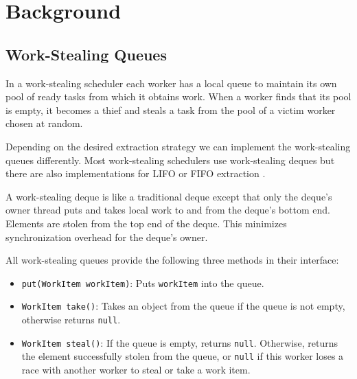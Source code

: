 
\chapter{Background}
\label{chap:queues-background}

\section{Work-Stealing Queues}
\label{sec:queues-background-work-stealing-queues}

In a work-stealing scheduler each worker has a local queue to maintain
its own pool of ready tasks from which it obtains work. When a worker
finds that its pool is empty, it becomes a thief and steals a task
from the pool of a victim worker chosen at random.

Depending on the desired extraction strategy we can implement the
work-stealing queues differently. Most work-stealing schedulers use
work-stealing deques \cite{Arora2001, Acar2002, Blumofe1995,
  Frigo1998, Danaher2005} but there are also implementations for LIFO
or FIFO extraction \cite{Michael2009}.

A work-stealing deque is like a traditional deque \cite{Knuth1997}
except that only the deque's owner thread puts and takes local work to
and from the deque's bottom end. Elements are stolen from the top end
of the deque. This minimizes synchronization overhead for the deque's
owner.

All work-stealing queues provide the following three methods in their
interface:

\begin{itemize}
\item \lstinline!put(WorkItem workItem)!: Puts \lstinline!workItem!
  into the queue.
\item \lstinline!WorkItem take()!: Takes an object from the queue if
  the queue is not empty, otherwise returns \lstinline!null!.
\item \lstinline!WorkItem steal()!: If the queue is empty, returns
  \lstinline!null!. Otherwise, returns the element successfully stolen
  from the queue, or \lstinline!null! if this worker loses a race with
  another worker to steal or take a work item.
\end{itemize}



